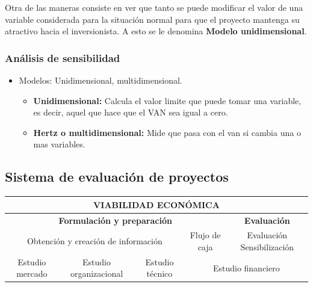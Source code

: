 \documentclass{templateNote}
\begin{document}
Otra de las maneras consiste en ver que tanto se puede modificar el valor de una variable considerada para la situación normal para que el proyecto mantenga su atractivo hacia el inversionista. A esto se le denomina \textbf{Modelo unidimensional}.

\subsubsection*{Análisis de sensibilidad}
\begin{itemize}
    \item Modelos: Unidimensional, multidimensional.
    \begin{itemize}
        \item \textbf{Unidimensional:} Calcula el valor limite que puede tomar una variable, es decir, aquel que hace que el VAN sea igual a cero.
        \item \textbf{Hertz o multidimensional:} Mide que pasa con el van si cambia una o mas variables.
    \end{itemize}
\end{itemize}


\subsection*{Sistema de evaluación de proyectos}

\begin{table}[H]
    \centering
    \renewcommand{\arraystretch}{1.5} %
    \begin{adjustbox}{max width=\textwidth}
        \begin{tabular}{|c|c|c|c|c|}
            \hline
            \multicolumn{5}{|c|}{\textbf{VIABILIDAD ECONÓMICA}} \\ \hline
            \multicolumn{4}{|c|}{\textbf{Formulación y preparación}} & \multicolumn{1}{c|}{\textbf{Evaluación}} \\ \hline
            \multicolumn{3}{|c|}{Obtención y creación de información} & {Flujo de caja} & {Evaluación Sensibilización} \\ \hline
            {Estudio mercado} & {Estudio organizacional} & {Estudio técnico} & \multicolumn{2}{c|}{Estudio financiero} \\ \hline
        \end{tabular}
    \end{adjustbox}
\end{table}
\end{document}
